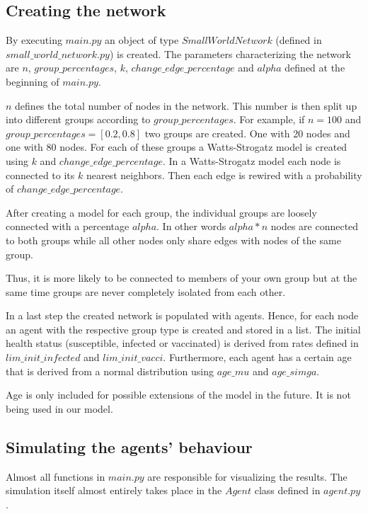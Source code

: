 \documentclass[11pt]{article}
\begin{document}
\subsection{Creating the network}
By executing $main.py$ an object of type $SmallWorldNetwork$ (defined in\\ $small\_world\_network.py$) is created. The parameters characterizing the network are $n$, $group\_percentages$, $k$, $change\_edge\_percentage$ and $alpha$ defined at the beginning of $main.py$.

$n$ defines the total number of nodes in the network. This number is then split up into different groups according to $group\_percentages$. For example, if $n=100$ and $group\_percentages = [0.2, 0.8]$ two groups are created. One with 20 nodes and one with 80 nodes. For each of these groups a Watts-Strogatz model is created using $k$ and $change\_edge\_percentage$. In a Watts-Strogatz model each node is connected to its $k$ nearest neighbors. Then each edge is rewired with a probability of  $change\_edge\_percentage$.

After creating a model for each group, the individual groups are loosely connected with a percentage $alpha$. In other words $alpha * n$ nodes are connected to both groups while all other nodes only share edges with nodes of the same group.

Thus, it is more likely to be connected to members of your own group but at the same time groups are never completely isolated from each other. 

In a last step the created network is populated with agents. Hence, for each node an agent with the respective group type is created and stored in a list. The initial health status (susceptible, infected or vaccinated) is derived from rates defined in $lim\_init\_infected$ and $lim\_init\_vacci$. Furthermore, each agent has a certain age that is derived from a normal distribution using $age\_mu$ and $age\_simga$.

Age is only included for possible extensions of the model in the future. It is not being used in our model.


\subsection{Simulating the agents' behaviour}
Almost all functions in $main.py$ are responsible for visualizing the results.
The simulation itself almost entirely takes place in the $Agent$ class defined in $agent.py$.
\end{document}
